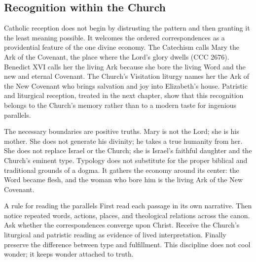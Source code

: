 \subsection{Recognition within the Church}

Catholic reception does not begin by distrusting the pattern and then granting
it the least meaning possible.  It welcomes the ordered correspondences as a
providential feature of the one divine economy.  The Catechism calls Mary the
Ark of the Covenant, the place where the Lord's glory dwells (CCC 2676).
Benedict XVI calls her the living Ark because she bore the living Word and the
new and eternal Covenant.  The Church's Visitation liturgy names her the Ark
of the New Covenant who brings salvation and joy into Elizabeth's house.
Patristic and liturgical reception, treated in the next chapter, show that this
recognition belongs to the Church's memory rather than to a modern taste for
ingenious parallels.

The necessary boundaries are positive truths.  Mary is not the Lord; she is
his mother.  She does not generate his divinity; he takes a true humanity from
her.  She does not replace Israel or the Church; she is Israel's faithful
daughter and the Church's eminent type.  Typology does not substitute for the
proper biblical and traditional grounds of a dogma.  It gathers the economy
around its center: the Word became flesh, and the woman who bore him is the
living Ark of the New Covenant.

\begin{studybox}{A rule for reading the parallels}
First read each passage in its own narrative.  Then notice repeated words,
actions, places, and theological relations across the canon.  Ask whether the
correspondences converge upon Christ.  Receive the Church's liturgical and
patristic reading as evidence of lived interpretation.  Finally preserve the
difference between type and fulfillment.  This discipline does not cool
wonder; it keeps wonder attached to truth.
\end{studybox}

